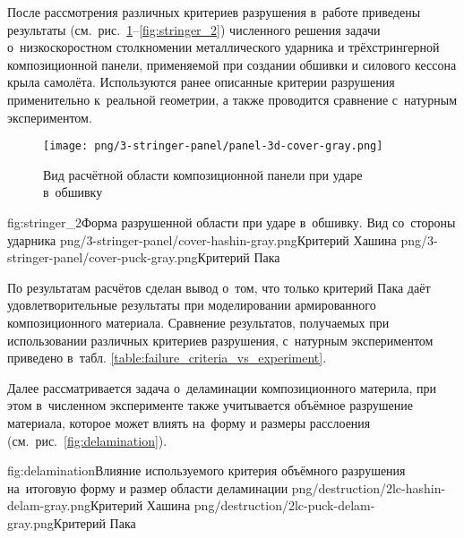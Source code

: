 \documentclass[a4paper,14pt]{extarticle}
\numberwithin{equation}{section}
\begin{document}
        После рассмотрения различных критериев разрушения в~работе приведены результаты
        (см.~рис.~\ref{fig:stringer_1}--\ref{fig:stringer_2}) численного решения задачи о~низкоскоростном столкномении
        металлического ударника и трёхстрингерной композиционной панели, применяемой при создании обшивки и силового
        кессона крыла самолёта. Используются ранее описанные критерии разрушения применительно к~реальной геометрии, а
        также проводится сравнение с~натурным экспериментом.

        \begin{figure}[h!]
            \begin{center}
                \texttt{[image: png/3-stringer-panel/panel-3d-cover-gray.png]}
            \end{center}
            \caption{Вид расчётной области композиционной панели при ударе в~обшивку}
            \label{fig:stringer_1}
        \end{figure}

        \twofigsT
            {fig:stringer_2}{Форма разрушенной области при ударе в~обшивку. Вид со~стороны ударника}
            {png/3-stringer-panel/cover-hashin-gray.png}{Критерий Хашина}
            {png/3-stringer-panel/cover-puck-gray.png}{Критерий Пака}

        По результатам расчётов сделан вывод о~том, что только критерий Пака даёт удовлетворительные результаты при
        моделировании армированного композиционного материала. Сравнение результатов, получаемых при использовании
        различных критериев разрушения, с~натурным экспериментом приведено в~табл.
        \ref{table:failure_criteria_vs_experiment}.

        Далее рассматривается задача о~деламинации композиционного материла, при этом в~численном эксперименте также
        учитывается объёмное разрушение материала, которое может влиять на~форму и размеры расслоения
        (см.~рис.~\ref{fig:delamination}).

        \twofigsT
            {fig:delamination}{Влияние используемого критерия объёмного разрушения на~итоговую форму и размер области
                               деламинации}
            {png/destruction/2lc-hashin-delam-gray.png}{Критерий Хашина}
            {png/destruction/2lc-puck-delam-gray.png}{Критерий Пака}
\end{document}
